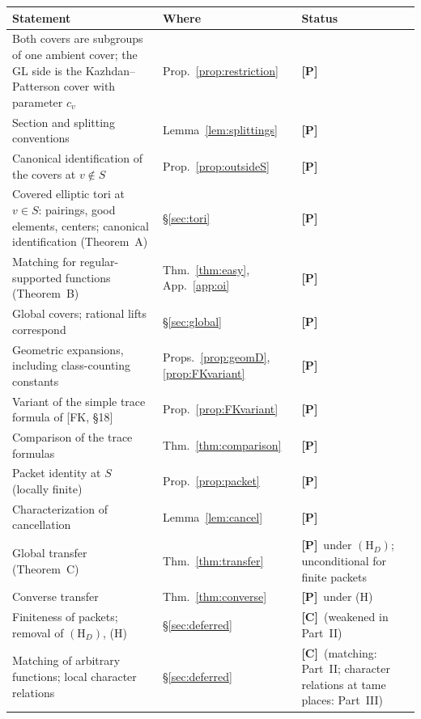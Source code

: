 \documentclass[12pt]{article}
\newcommand{\GL}{\mathrm{GL}}
\newcommand{\Pv}{\textbf{[P]}}
\newcommand{\Cv}{\textbf{[C]}}
\theoremstyle{plain}
\theoremstyle{definition}
\begin{document}
\begin{center}
\begin{tabular}{>{\raggedright\arraybackslash}p{}>{\raggedright\arraybackslash}p{}>{\raggedright\arraybackslash}p{}}
\toprule
Statement & Where & Status\\
\midrule
Both covers are subgroups of one ambient cover; the $\GL$ side is the Kazhdan--Patterson cover with parameter $c_v$ & Prop.~\ref{prop:restriction} & \Pv\\
Section and splitting conventions & Lemma~\ref{lem:splittings} & \Pv\\
Canonical identification of the covers at $v\notin S$ & Prop.~\ref{prop:outsideS} & \Pv\\
Covered elliptic tori at $v\in S$: pairings, good elements, centers; canonical identification (Theorem~A) & \S\ref{sec:tori} & \Pv\\
Matching for regular-supported functions (Theorem~B) & Thm.~\ref{thm:easy}, App.~\ref{app:oi} & \Pv\\
Global covers; rational lifts correspond & \S\ref{sec:global} & \Pv\\
Geometric expansions, including class-counting constants & Props.~\ref{prop:geomD}, \ref{prop:FKvariant} & \Pv\\
Variant of the simple trace formula of [FK, \S18] & Prop.~\ref{prop:FKvariant} & \Pv\\
Comparison of the trace formulas & Thm.~\ref{thm:comparison} & \Pv\\
Packet identity at $S$ (locally finite) & Prop.~\ref{prop:packet} & \Pv\\
Characterization of cancellation & Lemma~\ref{lem:cancel} & \Pv\\
Global transfer (Theorem~C) & Thm.~\ref{thm:transfer} & \Pv\ under $(\mathrm H_D)$; unconditional for finite packets\\
Converse transfer & Thm.~\ref{thm:converse} & \Pv\ under (H)\\
Finiteness of packets; removal of $(\mathrm H_D)$, (H) & \S\ref{sec:deferred} & \Cv\ (weakened in Part~II)\\
Matching of arbitrary functions; local character relations & \S\ref{sec:deferred} & \Cv\ (matching: Part~II; character relations at tame places: Part~III)\\
\bottomrule
\end{tabular}
\end{center}
\end{document}
